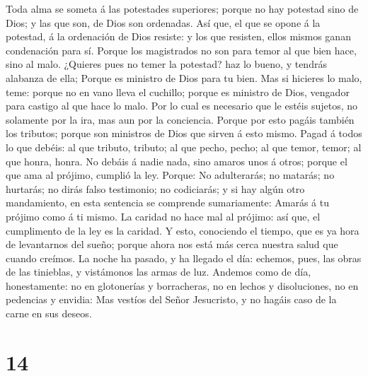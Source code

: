  Toda alma se someta á las potestades superiores; porque no
hay potestad sino de Dios; y las que son, de Dios son ordenadas.
 Así que, el que se opone á la potestad, á la ordenación de
Dios resiste: y los que resisten, ellos mismos ganan condenación para
sí.  Porque los magistrados no son para temor al que bien
hace, sino al malo. ¿Quieres pues no temer la potestad? haz lo bueno, y
tendrás alabanza de ella;  Porque es ministro de Dios para
tu bien. Mas si hicieres lo malo, teme: porque no en vano lleva el
cuchillo; porque es ministro de Dios, vengador para castigo al que hace
lo malo.  Por lo cual es necesario que le estéis sujetos, no
solamente por la ira, mas aun por la conciencia.  Porque por
esto pagáis también los tributos; porque son ministros de Dios que
sirven á esto mismo.  Pagad á todos lo que debéis: al que
tributo, tributo; al que pecho, pecho; al que temor, temor; al que
honra, honra.  No debáis á nadie nada, sino amaros unos á
otros; porque el que ama al prójimo, cumplió la ley. 
Porque: No adulterarás; no matarás; no hurtarás; no dirás falso
testimonio; no codiciarás; y si hay algún otro mandamiento, en esta
sentencia se comprende sumariamente: Amarás á tu prójimo como á ti
mismo.  La caridad no hace mal al prójimo: así que, el
cumplimento de la ley es la caridad.  Y esto, conociendo el
tiempo, que es ya hora de levantarnos del sueño; porque ahora nos está
más cerca nuestra salud que cuando creímos.  La noche ha
pasado, y ha llegado el día: echemos, pues, las obras de las tinieblas,
y vistámonos las armas de luz.  Andemos como de día,
honestamente: no en glotonerías y borracheras, no en lechos y
disoluciones, no en pedencias y envidia:  Mas vestíos del
Señor Jesucristo, y no hagáis caso de la carne en sus deseos.

\hypertarget{section-13}{%
\section{14}\label{section-13}}

